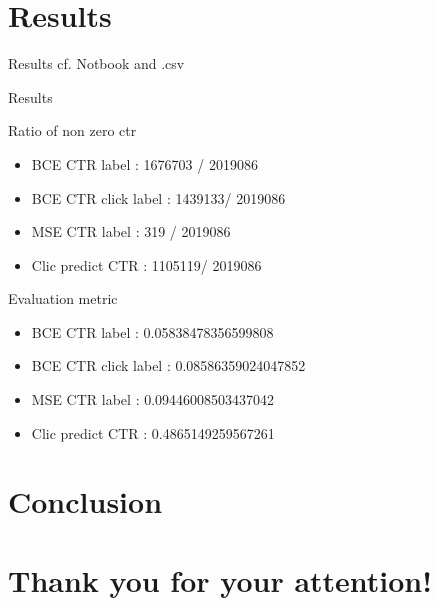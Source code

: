 \documentclass[compress,xcolor=table]{beamer}
\begin{document}
\section{Results}
\begin{frame}{Results}
	cf. Notbook and .csv
\end{frame}

\begin{frame}{Results}
	\begin{block}{Ratio of non zero ctr}
		\begin{itemize}
			\item BCE CTR label : 1676703 / 2019086
			\item BCE CTR click label :  1439133/ 2019086
			\item MSE CTR label :  319 / 2019086
			\item Clic predict CTR : 1105119/ 2019086
		\end{itemize}
	\end{block}

	\begin{block}{Evaluation metric}
		\begin{itemize}
			\item BCE CTR label : 0.05838478356599808
			\item BCE CTR click label :  0.08586359024047852
			\item MSE CTR label : 0.09446008503437042
			\item Clic predict CTR :  0.4865149259567261
		\end{itemize}
	\end{block}
	
	
\end{frame}

\section{Conclusion}
		

\section{Thank you for your attention!}
\end{document}
